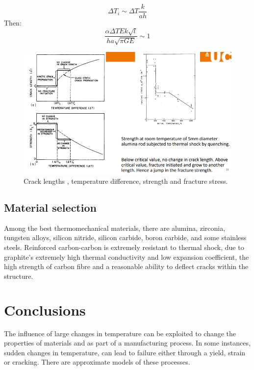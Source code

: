 \begin{equation}
    \Delta T_i \sim \Delta T \frac{k}{ah}
\end{equation}
Then:
\begin{equation}
    \frac{\alpha \Delta T E k \sqrt{l}}{ha\sqrt{\pi G E}} \sim 1
\end{equation}
\begin{figure}[H]
    \centering
    \includegraphics[width = \textwidth]{img/figure55.png}
    \caption{Crack lengths , temperature difference, strength and fracture stress.}
\end{figure}
\subsection{Material selection}
Among the best thermomechanical materials, there are alumina, zirconia, tungsten alloys, silicon nitride, silicon carbide, boron carbide, and some stainless steels. Reinforced carbon-carbon is extremely resistant to thermal shock, due to graphite's extremely high thermal conductivity and low expansion coefficient, the high strength of carbon fibre and a reasonable ability to deflect cracks within the structure.
\section{Conclusions}
The influence of large changes in temperature can be exploited to change the properties of materials and as part of a manufacturing process. In some instances, sudden changes in temperature, can lead to failure either through a yield, strain or cracking. There are approximate models of these processes.
